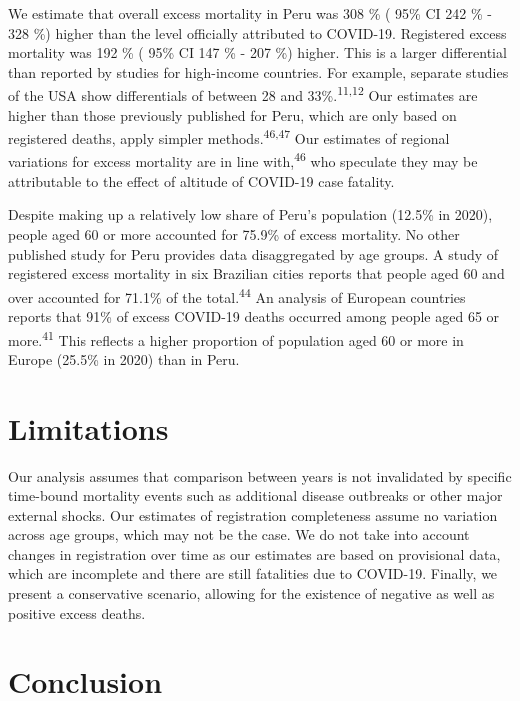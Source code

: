 \documentclass[
]{article}
\begin{document}
We estimate that overall excess mortality in Peru was 308 \% ( 95\% CI 242 \% - 328 \%) higher than the level officially attributed to COVID-19. Registered excess mortality was 192 \% ( 95\% CI 147 \% - 207 \%) higher. This is a larger differential than reported by studies for high-income countries. For example, separate studies of the USA show differentials of between 28 and 33\%.\textsuperscript{11,12} Our estimates are higher than those previously published for Peru, which are only based on registered deaths, apply simpler methods.\textsuperscript{46,47} Our estimates of regional variations for excess mortality are in line with,\textsuperscript{46} who speculate they may be attributable to the effect of altitude of COVID-19 case fatality.

Despite making up a relatively low share of Peru's population (12.5\% in 2020), people aged 60 or more accounted for 75.9\% of excess mortality. No other published study for Peru provides data disaggregated by age groups. A study of registered excess mortality in six Brazilian cities reports that people aged 60 and over accounted for 71.1\% of the total.\textsuperscript{44} An analysis of European countries reports that 91\% of excess COVID-19 deaths occurred among people aged 65 or more.\textsuperscript{41} This reflects a higher proportion of population aged 60 or more in Europe (25.5\% in 2020) than in Peru.

\hypertarget{limitations}{%
\section{Limitations}\label{limitations}}

Our analysis assumes that comparison between years is not invalidated by specific time-bound mortality events such as additional disease outbreaks or other major external shocks. Our estimates of registration completeness assume no variation across age groups, which may not be the case. We do not take into account changes in registration over time as our estimates are based on provisional data, which are incomplete and there are still fatalities due to COVID-19. Finally, we present a conservative scenario, allowing for the existence of negative as well as positive excess deaths.

\hypertarget{conclusion}{%
\section{Conclusion}\label{conclusion}}
\end{document}
